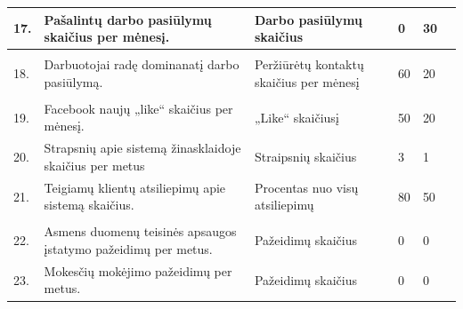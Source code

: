 \documentclass{VUMIFPSkursinis}
\begin{document}
\begin{table}[H]
\begin{tabular}{|p{0.6cm}|p{6cm}|p{2cm}|p{1.4cm}|p{1.6cm}|p{1.5cm}|}
\multicolumn{1}{|m{0.6cm}|}{17.}&\multicolumn{1}{m{6cm}|}{Pašalintų darbo pasiūlymų skaičius per mėnesį.}&\multicolumn{1}{m{3cm}|}{Darbo pasiūlymų skaičius}&\multicolumn{1}{m{1.6cm}|}{0}&\multicolumn{1}{m{1.5cm}|}{30}\\ \hline

\rowcolor{gray!10}
\multicolumn{5}{|l|}{\textbf{IŠEIGA}} \\ \hline

\multicolumn{1}{|m{0.6cm}|}{18.}&\multicolumn{1}{m{6cm}|}{Darbuotojai radę dominanatį darbo pasiūlymą.}&\multicolumn{1}{m{3cm}|}{Peržiūrėtų kontaktų skaičius per mėnesį}&\multicolumn{1}{m{1.6cm}|}{60}&\multicolumn{1}{m{1.5cm}|}{20}\\ \hline

\rowcolor{gray!10}
\multicolumn{5}{|l|}{\textbf{ĮVAIZDIS}} \\ \hline

\multicolumn{1}{|m{0.6cm}|}{19.}&\multicolumn{1}{m{6cm}|}{Facebook naujų „like“ skaičius per mėnesį.}&\multicolumn{1}{m{3cm}|}{„Like“ skaičiusį}&\multicolumn{1}{m{1.6cm}|}{50}&\multicolumn{1}{m{1.5cm}|}{20}\\ \hline

\multicolumn{1}{|m{0.6cm}|}{20.}&\multicolumn{1}{m{6cm}|}{Strapsnių apie sistemą žinasklaidoje skaičius per metus}&\multicolumn{1}{m{3cm}|}{Straipsnių skaičius}&\multicolumn{1}{m{1.6cm}|}{3}&\multicolumn{1}{m{1.5cm}|}{1}\\ \hline

\multicolumn{1}{|m{0.6cm}|}{21.}&\multicolumn{1}{m{6cm}|}{Teigiamų klientų atsiliepimų apie sistemą skaičius.}&\multicolumn{1}{m{3cm}|}{Procentas nuo visų atsiliepimų}&\multicolumn{1}{m{1.6cm}|}{80}&\multicolumn{1}{m{1.5cm}|}{50}\\ \hline

\rowcolor{gray!10}
\multicolumn{5}{|l|}{\textbf{REGULIAVIMAS}} \\ \hline

\multicolumn{1}{|m{0.6cm}|}{22.}&\multicolumn{1}{m{6cm}|}{Asmens duomenų teisinės apsaugos įstatymo pažeidimų per metus.}&\multicolumn{1}{m{3cm}|}{Pažeidimų skaičius}&\multicolumn{1}{m{1.6cm}|}{0}&\multicolumn{1}{m{1.5cm}|}{0}\\ \hline

\multicolumn{1}{|m{0.6cm}|}{23.}&\multicolumn{1}{m{6cm}|}{Mokesčių mokėjimo pažeidimų per metus.}&\multicolumn{1}{m{3cm}|}{Pažeidimų skaičius}&\multicolumn{1}{m{1.6cm}|}{0}&\multicolumn{1}{m{1.5cm}|}{0}\\ \hline

\end{tabular}
\end{table}
\end{document}
